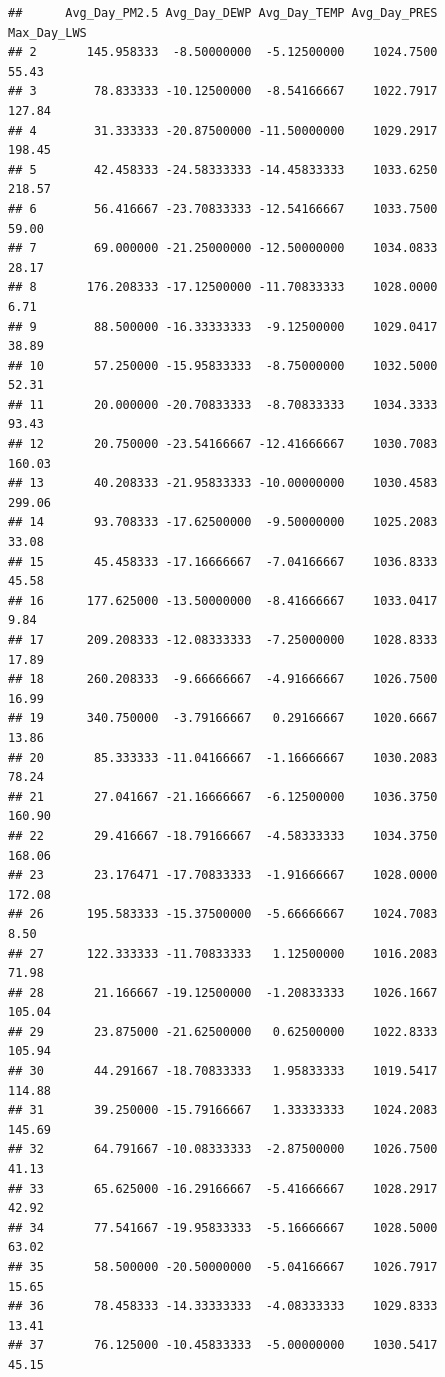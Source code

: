 \documentclass[
]{article}
\begin{document}
\begin{verbatim}
##      Avg_Day_PM2.5 Avg_Day_DEWP Avg_Day_TEMP Avg_Day_PRES Max_Day_LWS
## 2       145.958333  -8.50000000  -5.12500000    1024.7500       55.43
## 3        78.833333 -10.12500000  -8.54166667    1022.7917      127.84
## 4        31.333333 -20.87500000 -11.50000000    1029.2917      198.45
## 5        42.458333 -24.58333333 -14.45833333    1033.6250      218.57
## 6        56.416667 -23.70833333 -12.54166667    1033.7500       59.00
## 7        69.000000 -21.25000000 -12.50000000    1034.0833       28.17
## 8       176.208333 -17.12500000 -11.70833333    1028.0000        6.71
## 9        88.500000 -16.33333333  -9.12500000    1029.0417       38.89
## 10       57.250000 -15.95833333  -8.75000000    1032.5000       52.31
## 11       20.000000 -20.70833333  -8.70833333    1034.3333       93.43
## 12       20.750000 -23.54166667 -12.41666667    1030.7083      160.03
## 13       40.208333 -21.95833333 -10.00000000    1030.4583      299.06
## 14       93.708333 -17.62500000  -9.50000000    1025.2083       33.08
## 15       45.458333 -17.16666667  -7.04166667    1036.8333       45.58
## 16      177.625000 -13.50000000  -8.41666667    1033.0417        9.84
## 17      209.208333 -12.08333333  -7.25000000    1028.8333       17.89
## 18      260.208333  -9.66666667  -4.91666667    1026.7500       16.99
## 19      340.750000  -3.79166667   0.29166667    1020.6667       13.86
## 20       85.333333 -11.04166667  -1.16666667    1030.2083       78.24
## 21       27.041667 -21.16666667  -6.12500000    1036.3750      160.90
## 22       29.416667 -18.79166667  -4.58333333    1034.3750      168.06
## 23       23.176471 -17.70833333  -1.91666667    1028.0000      172.08
## 26      195.583333 -15.37500000  -5.66666667    1024.7083        8.50
## 27      122.333333 -11.70833333   1.12500000    1016.2083       71.98
## 28       21.166667 -19.12500000  -1.20833333    1026.1667      105.04
## 29       23.875000 -21.62500000   0.62500000    1022.8333      105.94
## 30       44.291667 -18.70833333   1.95833333    1019.5417      114.88
## 31       39.250000 -15.79166667   1.33333333    1024.2083      145.69
## 32       64.791667 -10.08333333  -2.87500000    1026.7500       41.13
## 33       65.625000 -16.29166667  -5.41666667    1028.2917       42.92
## 34       77.541667 -19.95833333  -5.16666667    1028.5000       63.02
## 35       58.500000 -20.50000000  -5.04166667    1026.7917       15.65
## 36       78.458333 -14.33333333  -4.08333333    1029.8333       13.41
## 37       76.125000 -10.45833333  -5.00000000    1030.5417       45.15

\end{verbatim}
\end{document}
